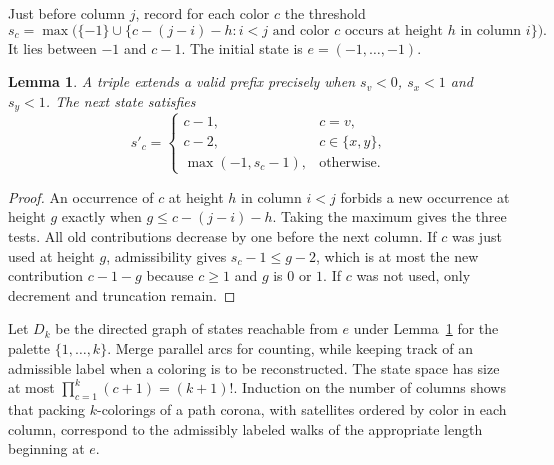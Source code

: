 \documentclass[11pt]{article}
\newtheorem{lemma}[theorem]{Lemma}
\begin{document}
Just before column \(j\), record for each color \(c\) the threshold
\begin{equation}\label{state}
 s_c=\max\!\bigl(\{-1\}\cup
    \{c-(j-i)-h : i<j\text{ and color }c
                   \text{ occurs at height }h\text{ in column }i\}\bigr).
\end{equation}
It lies between \(-1\) and \(c-1\). The initial state is
\(e=(-1,\ldots,-1)\).
\begin{lemma}\label{step}
A triple extends a valid prefix precisely when \(s_v<0\), \(s_x<1\) and
\(s_y<1\). The next state satisfies
\[
s'_c=\begin{cases}
 c-1,&c=v,\\
 c-2,&c\in\{x,y\},\\
 \max(-1,s_c-1),&\text{otherwise}.
\end{cases}
\]
\end{lemma}
\begin{proof}
An occurrence of \(c\) at height \(h\) in column \(i<j\) forbids a new
occurrence at height \(g\) exactly when \(g\le c-(j-i)-h\).
Taking the maximum gives the three tests. All old contributions decrease
by one before the next column. If \(c\) was just used at height \(g\),
admissibility gives \(s_c-1\le g-2\), which is at most the new contribution
\(c-1-g\) because \(c\ge1\) and \(g\) is \(0\) or \(1\).
If \(c\) was not used, only decrement and truncation remain.
\end{proof}

Let \(D_k\) be the directed graph of states reachable from \(e\) under
Lemma~\ref{step} for the palette \(\{1,\ldots,k\}\). Merge parallel arcs
for counting, while keeping track of an admissible label when a coloring
is to be reconstructed. The state space has size at most
\(\prod_{c=1}^k(c+1)=(k+1)!\). Induction on the number of columns shows that
packing \(k\)-colorings of a path corona, with satellites ordered by
color in each column, correspond to the admissibly labeled walks of
the appropriate length beginning at \(e\).
\end{document}
